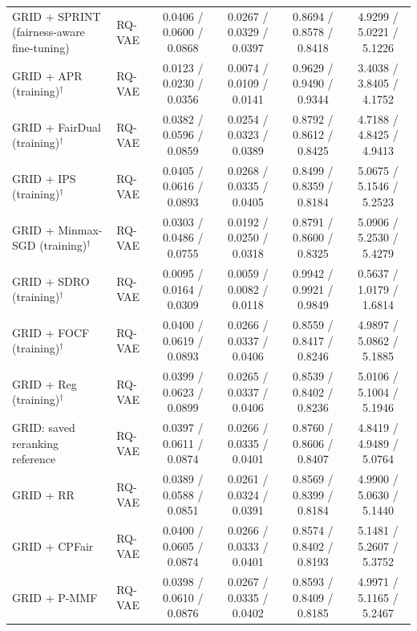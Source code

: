 \begin{table}[p]
{\begin{tabular}{llcccc}
GRID + SPRINT (fairness-aware fine-tuning) & RQ-VAE & 0.0406 / 0.0600 / 0.0868 & 0.0267 / 0.0329 / 0.0397 & 0.8694 / 0.8578 / 0.8418 & 4.9299 / 5.0221 / 5.1226 \\
GRID + APR (training)$^{\dagger}$ & RQ-VAE & 0.0123 / 0.0230 / 0.0356 & 0.0074 / 0.0109 / 0.0141 & 0.9629 / 0.9490 / 0.9344 & 3.4038 / 3.8405 / 4.1752 \\
GRID + FairDual (training)$^{\dagger}$ & RQ-VAE & 0.0382 / 0.0596 / 0.0859 & 0.0254 / 0.0323 / 0.0389 & 0.8792 / 0.8612 / 0.8425 & 4.7188 / 4.8425 / 4.9413 \\
GRID + IPS (training)$^{\dagger}$ & RQ-VAE & 0.0405 / 0.0616 / 0.0893 & 0.0268 / 0.0335 / 0.0405 & 0.8499 / 0.8359 / 0.8184 & 5.0675 / 5.1546 / 5.2523 \\
GRID + Minmax-SGD (training)$^{\dagger}$ & RQ-VAE & 0.0303 / 0.0486 / 0.0755 & 0.0192 / 0.0250 / 0.0318 & 0.8791 / 0.8600 / 0.8325 & 5.0906 / 5.2530 / 5.4279 \\
GRID + SDRO (training)$^{\dagger}$ & RQ-VAE & 0.0095 / 0.0164 / 0.0309 & 0.0059 / 0.0082 / 0.0118 & 0.9942 / 0.9921 / 0.9849 & 0.5637 / 1.0179 / 1.6814 \\
GRID + FOCF (training)$^{\dagger}$ & RQ-VAE & 0.0400 / 0.0619 / 0.0893 & 0.0266 / 0.0337 / 0.0406 & 0.8559 / 0.8417 / 0.8246 & 4.9897 / 5.0862 / 5.1885 \\
GRID + Reg (training)$^{\dagger}$ & RQ-VAE & 0.0399 / 0.0623 / 0.0899 & 0.0265 / 0.0337 / 0.0406 & 0.8539 / 0.8402 / 0.8236 & 5.0106 / 5.1004 / 5.1946 \\
GRID: saved reranking reference & RQ-VAE & 0.0397 / 0.0611 / 0.0874 & 0.0266 / 0.0335 / 0.0401 & 0.8760 / 0.8606 / 0.8407 & 4.8419 / 4.9489 / 5.0764 \\
GRID + RR & RQ-VAE & 0.0389 / 0.0588 / 0.0851 & 0.0261 / 0.0324 / 0.0391 & 0.8569 / 0.8399 / 0.8184 & 4.9900 / 5.0630 / 5.1440 \\
GRID + CPFair & RQ-VAE & 0.0400 / 0.0605 / 0.0874 & 0.0266 / 0.0333 / 0.0401 & 0.8574 / 0.8402 / 0.8193 & 5.1481 / 5.2607 / 5.3752 \\
GRID + P-MMF & RQ-VAE & 0.0398 / 0.0610 / 0.0876 & 0.0267 / 0.0335 / 0.0402 & 0.8593 / 0.8409 / 0.8185 & 4.9971 / 5.1165 / 5.2467 \\
\bottomrule
\end{tabular}%
}
\end{table}

